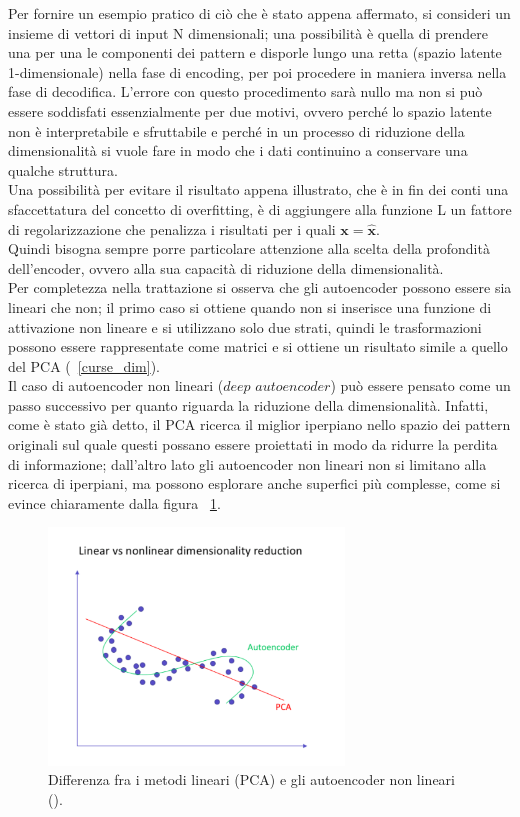 Per fornire un esempio pratico di ciò che è stato appena affermato, si consideri un insieme di vettori di input N dimensionali; una possibilità è quella di prendere una per una le componenti dei pattern e disporle lungo una retta (spazio latente 1-dimensionale) nella fase di encoding, per poi procedere in maniera inversa nella fase di decodifica. L'errore con questo procedimento sarà nullo ma non si può essere soddisfati essenzialmente per due motivi, ovvero perché lo spazio latente non è interpretabile e sfruttabile e perché in un processo di riduzione della dimensionalità si vuole fare in modo che i dati continuino a conservare una qualche struttura. \\
Una possibilità per evitare il risultato appena illustrato, che è in fin dei conti una sfaccettatura del concetto di overfitting, è di aggiungere alla funzione L un fattore di regolarizzazione che penalizza i risultati per i quali $\textbf{x} = \hat{\textbf{x}}$. \\
Quindi bisogna sempre porre particolare attenzione alla scelta della profondità dell'encoder, ovvero alla sua capacità di riduzione della dimensionalità. \\
Per completezza nella trattazione si osserva che gli autoencoder possono essere sia lineari che non; il primo caso si ottiene quando non si inserisce una funzione di attivazione non lineare e si utilizzano solo due strati, quindi le trasformazioni possono essere rappresentate come matrici e si ottiene un risultato simile a quello del PCA (~\ref{curse_dim}). \\
Il caso di autoencoder non lineari ($\textit{deep autoencoder}$) può essere pensato come un passo successivo per quanto riguarda la riduzione della dimensionalità. Infatti, come è stato già detto, il PCA ricerca il miglior iperpiano nello spazio dei pattern originali sul quale questi possano essere proiettati in modo da ridurre la perdita di informazione; dall'altro lato gli autoencoder non lineari non si limitano alla ricerca di iperpiani, ma possono esplorare anche superfici più complesse, come si evince chiaramente dalla figura ~\ref{autoencoder_non_lineari}.

\begin{figure}[h!]
	\centering
	\includegraphics[width=0.70\textwidth]{figs/Autoencoder_non_lineari.png}
	\caption{Differenza fra i metodi lineari (PCA) e gli autoencoder non lineari (\cite{Autoencoders}).}
	\label{autoencoder_non_lineari}
\end{figure}


